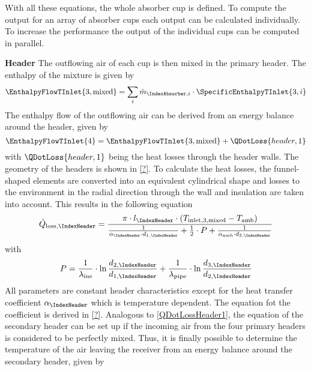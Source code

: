 With all these equations, the whole absorber cup is defined.
To compute the output for an array of absorber cups each output can be calculated individually.
To increase the performance the output of the individual cups can be computed in parallel.

\textbf{Header}
The outflowing air of each cup is then mixed in the primary header.
The enthalpy of the mixture is given by
\begin{equation}
    \EnthalpyFlowTInlet{3,\mathrm{mixed}} = \sum_i \dot{m}_{\IndexAbsorber, i} \cdot \SpecificEnthalpyTInlet{3,i}
\end{equation}
The enthalpy flow of the outflowing air can be derived from an energy balance around the header, given by
\begin{equation}
    \EnthalpyFlowTInlet{4} = \EnthalpyFlowTInlet{3,\mathrm{mixed}} + \QDotLoss{header,1}
\end{equation}
with \(\QDotLoss{header,1}\) being the heat losses through the header walls.
The geometry of the headers is shown in \cref{?}.
To calculate the heat losses, the funnel-shaped elements are converted into an equivalent cylindrical shape and losses to the environment in the radial direction through the wall and insulation are taken into account.
This results in the following equation
\begin{equation}
\dot{Q}_{\text {loss}, \IndexHeader}=
\frac{\pi \cdot l_{\IndexHeader} \cdot\left(T_{\mathrm{inlet,3,mixed}}-T_{\text {amb}}\right)}
{\frac{1}{\alpha_{\IndexHeader} \cdot d_{1, \IndexHeader}}+\frac{1}{2} \cdot P+\frac{1}{\alpha_{\mathrm{amb}} \cdot d_{3, \mathrm{\IndexHeader}}}}
    \label{eq:QDotLossHeader1}
\end{equation}
with
\begin{equation}
    P=\frac{1}{\lambda_{\text {ins}}} \cdot \ln \frac{d_{2, \IndexHeader}}{d_{1, \IndexHeader}}+\frac{1}{\lambda_{\text {pipe}}} \cdot \ln \frac{d_{3, \IndexHeader}}{d_{2, \IndexHeader}}
\end{equation}
All parameters are constant header characteristics except for the heat transfer coefficient \(\alpha_{\IndexHeader}\) which is temperature dependent.
The equation fot the coefficient is derived in \cref{?}.
Analogous to \cref{QDotLossHeader1}, the equation of the secondary header can be set up
if the incoming air from the four primary headers is considered to be perfectly mixed.
Thus, it is finally possible to determine the temperature of the air leaving the receiver from an energy balance around the secondary header, given by
